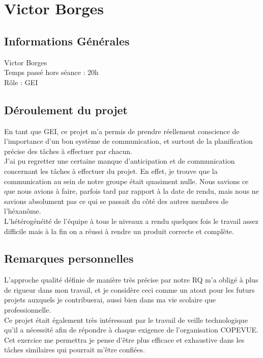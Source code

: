 \documentclass [a4paper] {report}
\begin{document}
\section*{Victor Borges}

\subsection*{Informations Générales}

Victor Borges \\
Temps passé hors séance : 20h \\
Rôle : GEI

\subsection*{Déroulement du projet}

En tant que GEI, ce projet m'a permis de prendre réellement conscience de l'importance d'un bon système de communication, et surtout de la planification précise des tâches à effectuer par chacun. \\

J'ai pu regretter une certaine manque d'anticipation et de communication concernant les tâches à effectuer du projet. En effet, je trouve que la communication au sein de notre groupe était quasiment nulle. Nous savions ce que nous avions à faire, parfois tard par rapport à la date de rendu, mais nous ne savions absolument pas ce qui se passait du côté des autres membres de l'héxanôme. \\

L'hétérogénéité de l'équipe à tous le niveaux a rendu quelques fois le travail assez difficile mais à la fin on a réussi à rendre un produit correcte et complète.

\subsection*{Remarques personnelles}

L'approche qualité définie de manière très précise par notre RQ m'a obligé à plus de rigueur dans mon travail, et je considère ceci comme un atout pour les futurs projets auxquels je contribuerai, aussi bien dans ma vie scolaire que professionnelle. \\

Ce projet était également très intéressant par le travail de veille technologique qu'il a nécessité afin de répondre à chaque exigence de l'organisation COPEVUE. Cet exercice me permettra je pense d'être plus efficace et exhaustive dans les tâches similaires qui pourrait m'être confiées.
\end{document}
